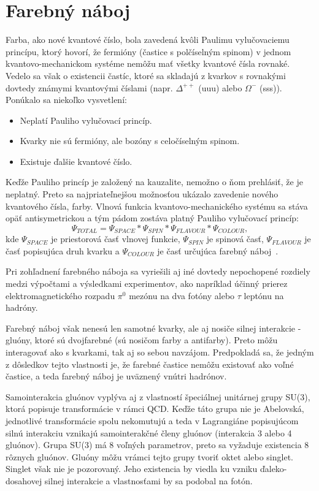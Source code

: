 \documentclass[thesismargins, thesislinespacing]{rnthesis}
\begin{document}
\section{Farebný náboj}
Farba, ako nové kvantové číslo, bola zavedená kvôli Paulimu vylučovaciemu princípu, ktorý hovorí, že fermióny (častice s polčíselným spinom) v jednom kvantovo-me\-cha\-nic\-kom systéme nemôžu mať všetky kvantové čísla rovnaké. Vedelo sa však o existencii častíc, ktoré sa skladajú z kvarkov s rovnakými dovtedy známymi kvantovými číslami (napr. $\Delta^{++}$ (uuu) alebo $\Omega^{-}$ (sss)). Ponúkalo sa niekoľko vysvetlení:
\begin{itemize}
	\item Neplatí Pauliho vylučovací princíp.
	\item Kvarky nie sú fermióny, ale bozóny s celočíselným spinom.
	\item Existuje ďalšie kvantové číslo.
\end{itemize}
Keďže Pauliho princíp je založený na kauzalite, nemožno o ňom prehlásiť, že je neplatný. Preto sa najpriateľnejšou možnosťou ukázalo zavedenie nového kvantového čísla, farby. Vlnová funkcia kvantovo-mechanického systému sa stáva opäť antisymetrickou a tým pádom zostáva platný Pauliho vylučovací princíp:
\begin{equation}
	\Psi_{TOTAL}=\Psi_{SPACE}*\Psi_{SPIN}*\Psi_{FLAVOUR}*\Psi_{COLOUR}, 
\end{equation}   
kde $\Psi_{SPACE}$ je priestorová časť vlnovej funkcie, $\Psi_{SPIN}$ je spinová časť, $\Psi_{FLAVOUR}$ je časť popisujúca druh kvarku a $\Psi_{COLOUR}$ je časť určujúca farebný náboj~\cite{1}.

Pri zohľadnení farebného náboja sa vyriešili aj iné dovtedy nepochopené rozdiely medzi výpočtami a výsledkami experimentov, ako napríklad účinný prierez elektromagnetického rozpadu $\pi^0$ mezónu na dva fotóny alebo $\tau$ leptónu na hadróny. 

Farebný náboj však nenesú len samotné kvarky, ale aj nosiče silnej interakcie - gluóny, ktoré sú dvojfarebné (sú nosičom farby a antifarby). Preto môžu interagovať ako s kvarkami, tak aj so sebou navzájom. Predpokladá sa, že jedným z dôsledkov tejto vlastnosti je, že farebné častice nemôžu existovať ako voľné častice, a teda farebný náboj je uväznený vnútri hadrónov.

Samointerakcia gluónov vyplýva aj z vlastností špeciálnej unitárnej grupy SU(3), ktorá popisuje transformácie v rámci QCD. Keďže táto grupa nie je Abelovská, jednotlivé transformácie spolu nekomutujú a teda v Lagrangiáne popisujúcom silnú interakciu vznikajú samointerakčné členy gluónov (interakcia 3 alebo 4 gluónov). Grupa SU(3) má 8 voľných parametrov, preto sa vyžaduje existencia 8 rôznych gluónov. Gluóny môžu vrámci tejto grupy tvoriť oktet alebo singlet. Singlet však nie je pozorovaný. Jeho existencia by viedla ku vzniku ďaleko-dosahovej silnej interakcie a vlastnosťami by sa podobal na fotón. 
\end{document}
